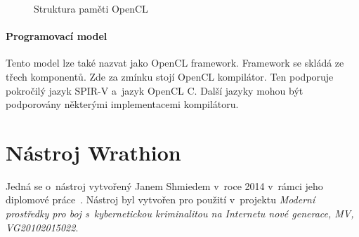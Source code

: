 \begin{figure}[ht]
    \begin{center}
    \end{center}
    \caption{Struktura paměti OpenCL \cite{Khronos:2015}}
    \label{memory}
\end{figure}
\subsubsection{Programovací model}
Tento model lze také nazvat jako OpenCL framework. Framework se skládá ze třech komponentů. Zde za
zmínku stojí OpenCL kompilátor. Ten podporuje pokročilý jazyk SPIR-V a~jazyk OpenCL C. Další
jazyky mohou být podporovány některými implementacemi kompilátoru.


\chapter{Nástroj Wrathion}
\label{ch:wrathion}
Jedná se o~nástroj vytvořený Janem Shmiedem v~roce 2014 v~rámci jeho diplomové
\linebreak práce~\cite{Schmied}. Nástroj byl vytvořen pro použití v~projektu {\it Moderní
prostředky pro boj s~kybernetickou kriminalitou na Internetu nové generace, MV, VG20102015022}.
